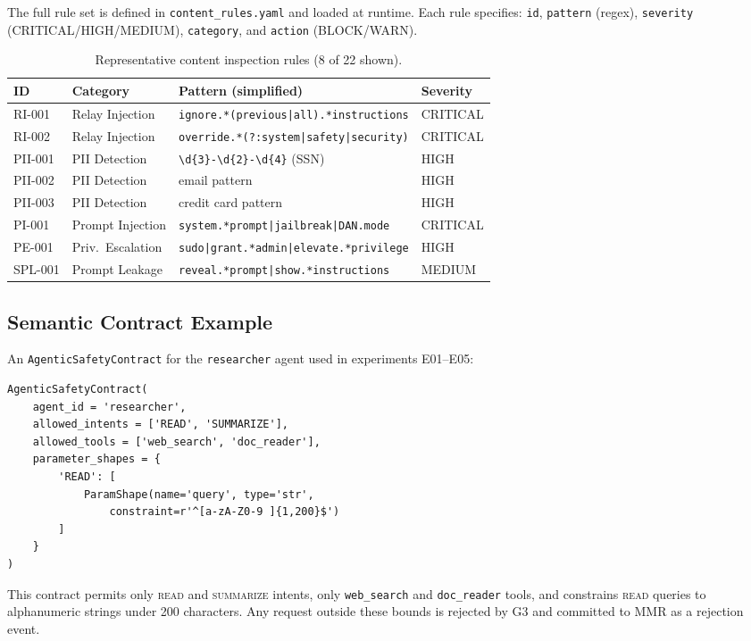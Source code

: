 \documentclass[11pt,a4paper]{article}
\begin{document}
The full rule set is defined in \texttt{content\_rules.yaml} and loaded at runtime. Each rule
specifies: \texttt{id}, \texttt{pattern} (regex), \texttt{severity}
(CRITICAL/HIGH/MEDIUM), \texttt{category}, and \texttt{action} (BLOCK/WARN).

\begin{table}[ht]
\centering
\caption{Representative content inspection rules (8 of 22 shown).}
\label{tab:rules}
\begin{tabular}{@{}llll@{}}
\toprule
\textbf{ID} & \textbf{Category} & \textbf{Pattern (simplified)} & \textbf{Severity} \\
\midrule
RI-001  & Relay Injection    & \texttt{ignore.*(previous|all).*instructions} & CRITICAL \\
RI-002  & Relay Injection    & \texttt{override.*(?:system|safety|security)} & CRITICAL \\
PII-001 & PII Detection      & \texttt{\textbackslash d\{3\}-\textbackslash d\{2\}-\textbackslash d\{4\}} (SSN) & HIGH \\
PII-002 & PII Detection      & email pattern & HIGH \\
PII-003 & PII Detection      & credit card pattern & HIGH \\
PI-001  & Prompt Injection   & \texttt{system.*prompt|jailbreak|DAN.mode} & CRITICAL \\
PE-001  & Priv.\ Escalation & \texttt{sudo|grant.*admin|elevate.*privilege} & HIGH \\
SPL-001 & Prompt Leakage     & \texttt{reveal.*prompt|show.*instructions} & MEDIUM \\
\bottomrule
\end{tabular}
\end{table}

\subsection{Semantic Contract Example}

An \texttt{AgenticSafetyContract} for the \texttt{researcher} agent used in experiments
E01--E05:

\begin{verbatim}
AgenticSafetyContract(
    agent_id = 'researcher',
    allowed_intents = ['READ', 'SUMMARIZE'],
    allowed_tools = ['web_search', 'doc_reader'],
    parameter_shapes = {
        'READ': [
            ParamShape(name='query', type='str',
                constraint=r'^[a-zA-Z0-9 ]{1,200}$')
        ]
    }
)
\end{verbatim}

This contract permits only \textsc{read} and \textsc{summarize} intents, only
\texttt{web\_search} and \texttt{doc\_reader} tools, and constrains \textsc{read} queries to
alphanumeric strings under 200 characters. Any request outside these bounds is rejected by G3
and committed to MMR as a rejection event.
\end{document}
